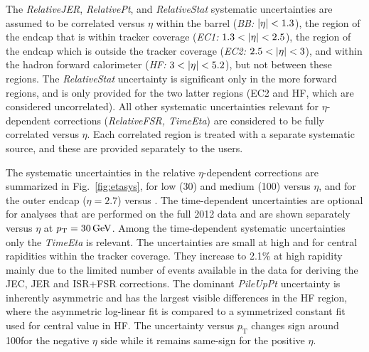 \documentclass[11pt,twoside,a4paper,cmspaper,final,collab]{cms-tdr}
\begin{document}
The \textit{RelativeJER}, \textit{RelativePt}, and \textit{RelativeStat} systematic uncertainties are assumed to be correlated versus $\eta$ within the barrel (\textit{BB:} $\lvert \eta \rvert<1.3$), the region of the endcap that is within tracker coverage (\textit{EC1:} $1.3<\lvert \eta \rvert<2.5$), the region of the endcap which is outside the tracker coverage (\textit{EC2:} $2.5<\lvert \eta \rvert<3$), and within the hadron forward calorimeter (\textit{HF:} $3<\lvert \eta \rvert<5.2$), but not between these regions. The \textit{RelativeStat} uncertainty is significant only in the more forward regions, and is only provided for the two latter regions (EC2 and HF, which are considered uncorrelated). All other systematic uncertainties relevant for $\eta$-dependent corrections (\textit{RelativeFSR, TimeEta}) are considered to be fully correlated versus $\eta$. Each correlated region is treated with a separate systematic source, and these are provided separately to the users.

The systematic uncertainties in the relative $\eta$-dependent corrections are summarized in Fig.~\ref{fig:etasys}, for low (30\GeV) and medium (100\GeV) \pt versus $\eta$, and for the outer endcap ($\eta=2.7$) versus \pt.
The time-dependent uncertainties are optional for analyses that are performed on the full 2012 data and are shown separately versus $\eta$ at $p_{\mathrm{T}}=30\,\text{Ge\hspace{-.08em}V}$. Among the time-dependent systematic uncertainties only the \textit{TimeEta} is relevant.
The uncertainties are small at high \pt and for central rapidities within the tracker coverage. They increase to 2.1\% at high rapidity mainly due to the limited number of events available in the data for deriving the JEC, JER and ISR+FSR corrections.  The dominant \textit{PileUpPt} uncertainty is inherently asymmetric and has the largest visible differences in the HF region, where the asymmetric log-linear fit is compared to a symmetrized constant fit used for central value in HF. The uncertainty versus $p_\mathrm{T}$ changes sign around 100\GeV for the negative $\eta$ side while it remains same-sign for the positive $\eta$.
\end{document}
